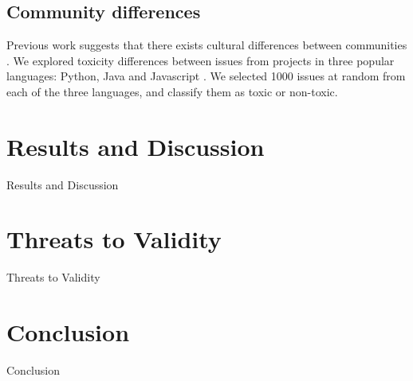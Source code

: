 \documentclass[conference]{IEEEtran}
\begin{document}
\subsection{Community differences} 
Previous work suggests that there exists cultural differences between communities \cite{b15}. We explored toxicity differences between issues from projects in three popular languages: Python, Java and Javascript \cite{b16}. We selected 1000 issues at random from each of the three languages, and classify them as toxic or non-toxic. 

\section{Results and Discussion}
Results and Discussion

\section{Threats to Validity}
Threats to Validity

\section{Conclusion}
Conclusion
\end{document}
